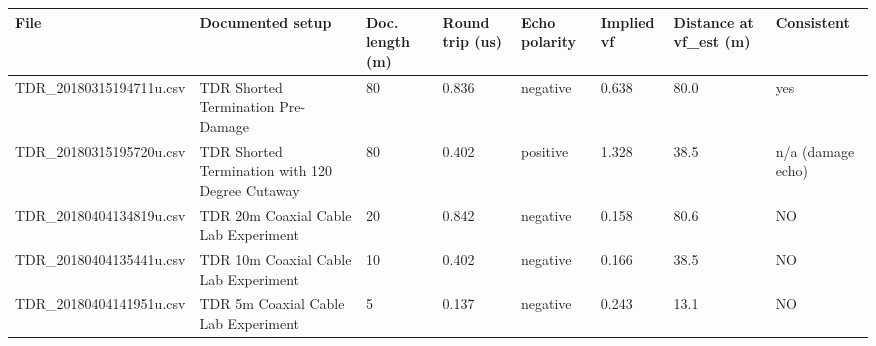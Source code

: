 \begin{tabular}{llllllll}
\toprule
File & Documented setup & Doc. length (m) & Round trip (us) & Echo polarity & Implied vf & Distance at vf\_est (m) & Consistent \\
\midrule
TDR\_20180315194711u.csv & TDR Shorted Termination Pre-Damage & 80 & 0.836 & negative & 0.638 & 80.0 & yes \\
TDR\_20180315195720u.csv & TDR Shorted Termination with 120 Degree Cutaway & 80 & 0.402 & positive & 1.328 & 38.5 & n/a (damage echo) \\
TDR\_20180404134819u.csv & TDR 20m Coaxial Cable Lab Experiment  & 20 & 0.842 & negative & 0.158 & 80.6 & NO \\
TDR\_20180404135441u.csv & TDR 10m Coaxial Cable Lab Experiment & 10 & 0.402 & negative & 0.166 & 38.5 & NO \\
TDR\_20180404141951u.csv & TDR 5m Coaxial Cable Lab Experiment & 5 & 0.137 & negative & 0.243 & 13.1 & NO \\
\bottomrule
\end{tabular}
